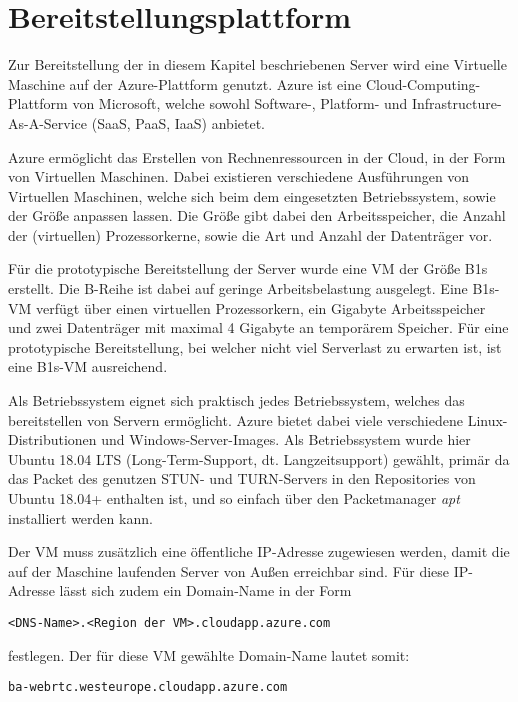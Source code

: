 \section{Bereitstellungsplattform}
Zur Bereitstellung der in diesem Kapitel beschriebenen Server wird eine Virtuelle Maschine auf der Azure-Plattform genutzt. Azure ist eine Cloud-Computing-Plattform von Microsoft, welche sowohl Software-, Platform- und Infrastructure-As-A-Service (SaaS, PaaS, IaaS) anbietet.\par

Azure ermöglicht das Erstellen von Rechnenressourcen in der Cloud, in der Form von Virtuellen Maschinen. Dabei existieren verschiedene Ausführungen von Virtuellen Maschinen, welche sich beim dem eingesetzten Betriebssystem, sowie der \glqq{}Größe\grqq{} anpassen lassen. Die Größe gibt dabei den Arbeitsspeicher, die Anzahl der (virtuellen) Prozessorkerne, sowie die Art und Anzahl der Datenträger vor.\par

Für die prototypische Bereitstellung der Server wurde eine \acf{VM} der Größe \glqq{}B1s\grqq{} erstellt. Die B-Reihe ist dabei auf geringe Arbeitsbelastung ausgelegt. Eine B1s-VM verfügt über einen virtuellen Prozessorkern, ein Gigabyte Arbeitsspeicher und zwei Datenträger mit maximal 4 Gigabyte an temporärem Speicher. Für eine prototypische Bereitstellung, bei welcher nicht viel Serverlast zu erwarten ist, ist eine B1s-VM ausreichend.\par

Als Betriebssystem eignet sich praktisch jedes Betriebssystem, welches das bereitstellen von Servern ermöglicht. Azure bietet dabei viele verschiedene Linux-Distributionen und Windows-Server-Images. Als Betriebssystem wurde hier Ubuntu 18.04 LTS (Long-Term-Support, dt. Langzeitsupport) gewählt, primär da das Packet des genutzen STUN- und TURN-Servers in den Repositories von Ubuntu 18.04+ enthalten ist, und so einfach über den Packetmanager \textit{apt} installiert werden kann.\par

Der \acs{VM} muss zusätzlich eine öffentliche IP-Adresse zugewiesen werden, damit die auf der Maschine laufenden Server von Außen erreichbar sind. Für diese IP-Adresse lässt sich zudem ein Domain-Name in der Form
\lstset{style=STYLE_COMMAND_LINE_ARGUMENT_SINGLE_LINE}
\begin{lstlisting}[belowskip=-0.8 \baselineskip]
<DNS-Name>.<Region der VM>.cloudapp.azure.com
\end{lstlisting}
festlegen. Der für diese VM gewählte Domain-Name lautet somit:
\lstset{style=STYLE_COMMAND_LINE_ARGUMENT_SINGLE_LINE}
\begin{lstlisting}[belowskip=-0.8 \baselineskip]
ba-webrtc.westeurope.cloudapp.azure.com
\end{lstlisting}

